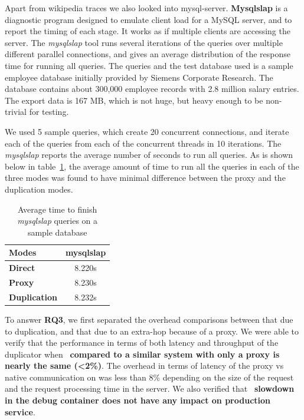 Apart from wikipedia traces we also looked into mysql-server. 
\textbf{Mysqlslap} is a diagnostic program designed to emulate client load for a MySQL server, and to report the timing of each stage. 
It works as if multiple clients are accessing the server. The \emph{mysqlslap} tool runs several iterations of the queries over multiple different parallel connections, and gives an average distribution of the response time for running all queries.
The queries and the test database used is a sample employee database initially provided by Siemens Corporate Research. 
The database contains about 300,000 employee records with 2.8 million salary entries. The export data is 167 MB, which is not huge, but heavy enough to be non-trivial for testing.

We used 5 sample queries, which create 20 concurrent connections, and iterate each of the queries from each of the concurrent threads in 10 iterations.
The \emph{mysqlslap} reports the average number of seconds to run all queries. As is shown below in table~\ref{tab:mysqlslap}, the average amount of time to run all the queries in each of the three modes was found to have minimal difference between the proxy and the duplication modes.

\begin{table}
	\centering
\begin{center}
	\begin{tabular}{l c}
	\toprule
	\textbf{Modes} & \textbf{mysqlslap}\\
	\midrule
	\textbf{Direct} & 8.220s \\
	\textbf{Proxy} & 8.230s \\
	\textbf{Duplication} & 8.232s \\
	\bottomrule
	\end{tabular}
\end{center}
\caption{Average time to finish \emph{mysqlslap} queries on a sample database}
\label{tab:mysqlslap}
\end{table}   

\begin{tcolorbox}
	To answer \textbf{RQ3}, we first separated the overhead comparisons between that due to duplication, and that due to an extra-hop because of a proxy. We were able to verify that the performance in terms of both latency and throughput of the duplicator when ~\textbf{compared to a similar system with only a proxy is nearly the same (\textless 2\%)}. The overhead in terms of latency of the proxy vs native communication on was less than 8\% depending on the size of the request and the request processing time in the server. We also verified that ~\textbf{slowdown in the debug container does not have any impact on production service}. 
\end{tcolorbox}